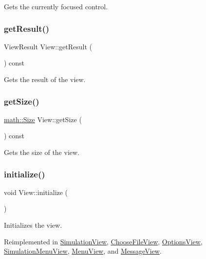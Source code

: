 Gets the currently focused control. 

\mbox{\label{class_view_a12b635ae31cb79f1f907e41e41bad74d}} 
\subsubsection{\texorpdfstring{getResult()}{getResult()}}
{\footnotesize\ttfamily View\+Result View\+::get\+Result (\begin{DoxyParamCaption}{ }\end{DoxyParamCaption}) const}



Gets the result of the view. 

\mbox{\label{class_view_aa134891eb68e40d94fdd0c074750edcb}} 
\subsubsection{\texorpdfstring{getSize()}{getSize()}}
{\footnotesize\ttfamily \mbox{\hyperlink{structmath_1_1_size}{math\+::\+Size}} View\+::get\+Size (\begin{DoxyParamCaption}{ }\end{DoxyParamCaption}) const}



Gets the size of the view. 

\mbox{\label{class_view_a334fa9a19d2faca0120ef2869c3dd8ad}} 
\subsubsection{\texorpdfstring{initialize()}{initialize()}}
{\footnotesize\ttfamily void View\+::initialize (\begin{DoxyParamCaption}{ }\end{DoxyParamCaption})\hspace{0.3cm}{\ttfamily [virtual]}}



Initializes the view. 



Reimplemented in \mbox{\hyperlink{class_simulation_view_ad54da8596a97ae64ecf71b05038587fc}{Simulation\+View}}, \mbox{\hyperlink{class_choose_file_view_a16e0c6bdcb247f7b792934c4d7901db5}{Choose\+File\+View}}, \mbox{\hyperlink{class_options_view_a0b35f3f0d318997b9600f1da91d58916}{Options\+View}}, \mbox{\hyperlink{class_simulation_menu_view_a6fe8f1da6cfa590491c735f6b41b6d87}{Simulation\+Menu\+View}}, \mbox{\hyperlink{class_menu_view_afeb1445373870a755eea4fe036351ba4}{Menu\+View}}, and \mbox{\hyperlink{class_message_view_a869de4a6b084eb205184de7f524160e2}{Message\+View}}.

